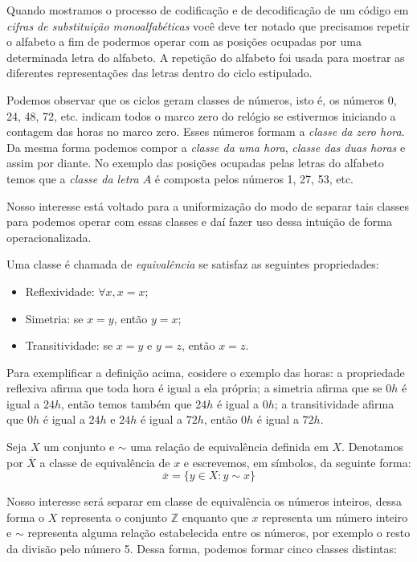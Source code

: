 Quando mostramos o processo de codifica\c{c}\~ao e de decodifica\c{c}\~ao de um c\'odigo em 
\textit{cifras de substitui\c{c}\~ao monoalfab\'eticas} voc\^e deve ter notado que precisamos repetir o alfabeto a fim de podermos operar com as posi\c{c}\~oes ocupadas por uma determinada letra do alfabeto. A repeti\c{c}\~ao do alfabeto foi usada para mostrar as diferentes representa\c{c}\~oes das letras dentro do ciclo estipulado.

Podemos observar que os ciclos geram classes de n\'umeros, isto \'e, os n\'umeros 0, 24, 48, 72, etc. indicam todos o marco zero do rel\'ogio se estivermos iniciando a contagem das horas no marco zero. Esses n\'umeros formam a \textsl{classe da zero hora}. Da mesma forma podemos compor a \textsl{classe da uma hora}, \textsl{classe das duas horas} e assim por diante. No exemplo das posi\c{c}\~oes ocupadas pelas letras do alfabeto temos que a \textsl{classe da letra $A$} \'e composta pelos n\'umeros 1, 27, 53, etc. 

Nosso interesse est\'a voltado para a uniformiza\c{c}\~ao do modo de separar tais classes para podemos operar com essas classes e da\'i fazer uso dessa intui\c{c}\~ao de forma operacionalizada. 

\begin{Df}
	Uma classe \'e chamada de \textsl{equival\^encia} se satisfaz as seguintes propriedades:
	\begin{itemize}
		\item Reflexividade: $\forall x, x=x$; 		
		\item Simetria: se $x=y$, ent\~ao $y=x$; 
		\item Transitividade: se $x=y$ e $y=z$, ent\~ao $x=z$.
	\end{itemize}
\end{Df}   

Para exemplificar a defini\c{c}\~ao acima, cosidere o exemplo das horas: a propriedade reflexiva afirma que toda hora \'e igual a ela pr\'opria; a simetria afirma que se $0h$ \'e igual a $24h$, ent\~ao temos tamb\'em que $24h$ \'e igual a $0h$; a transitividade afirma que $0h$ \'e igual a $24h$ e $24h$ \'e igual a $72h$, ent\~ao $0h$ \'e igual a $72h$.

Seja $X$ um conjunto e $\sim$ uma rela\c{c}\~ao de equival\^encia definida em $X$. Denotamos por $\overline{X}$ a classe de equival\^encia de $x$ e escrevemos, em s\'imbolos, da seguinte forma:	
	                     $$\overline{x}=\{y\in X: y\sim x\}$$

Nosso interesse ser\'a separar em classe de equival\^encia os n\'umeros inteiros, dessa forma o $X$ representa o conjunto $\mathbb{Z}$ enquanto que $x$ representa um n\'umero inteiro e $\sim$ representa alguma rela\c{c}\~ao estabelecida entre os n\'umeros, por exemplo o resto da divis\~ao pelo n\'umero 5. Dessa forma, podemos formar cinco classes distintas:


